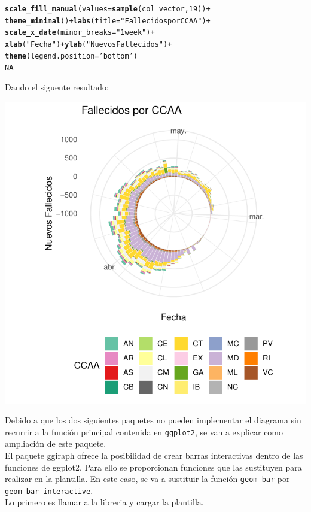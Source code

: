 \documentclass{article}\usepackage[]{graphicx}\usepackage[]{color}
\makeatletter
\def\maxwidth{ %
  \ifdim\Gin@nat@width>\linewidth
    \linewidth
  \else
    \Gin@nat@width
  \fi
}
\newcommand{\hlnum}[1]{\textcolor[rgb]{0.686,0.059,0.569}{#1}}%
\newcommand{\hlstr}[1]{\textcolor[rgb]{0.192,0.494,0.8}{#1}}%
\newcommand{\hlopt}[1]{\textcolor[rgb]{0,0,0}{#1}}%
\newcommand{\hlstd}[1]{\textcolor[rgb]{0.345,0.345,0.345}{#1}}%
\newcommand{\hlkwc}[1]{\textcolor[rgb]{0.333,0.667,0.333}{#1}}%
\newcommand{\hlkwd}[1]{\textcolor[rgb]{0.737,0.353,0.396}{\textbf{#1}}}%
\newenvironment{kframe}{%
 \def\at@end@of@kframe{}%
 \ifinner\ifhmode%
  \def\at@end@of@kframe{\end{minipage}}%
  \begin{minipage}{\columnwidth}%
 \fi\fi%
 \def\FrameCommand##1{\hskip\@totalleftmargin \hskip-\fboxsep
 \colorbox{shadecolor}{##1}\hskip-\fboxsep
     \hskip-\linewidth \hskip-\@totalleftmargin \hskip\columnwidth}%
 \MakeFramed {\advance\hsize-\width
   \@totalleftmargin\z@ \linewidth\hsize
   \@setminipage}}%
 {\par\unskip\endMakeFramed%
 \at@end@of@kframe}
\newenvironment{knitrout}{}{} %
\makeatother
\begin{document}
\begin{knitrout}
\color{fgcolor}\begin{kframe}
\begin{alltt}
  \hlkwd{scale_fill_manual}\hlstd{(}\hlkwc{values} \hlstd{=} \hlkwd{sample}\hlstd{(col_vector,} \hlnum{19}\hlstd{))} \hlopt{+}
  \hlkwd{theme_minimal}\hlstd{()} \hlopt{+} \hlkwd{labs}\hlstd{(}\hlkwc{title} \hlstd{=} \hlstr{"Fallecidos por CCAA"}\hlstd{)} \hlopt{+}
  \hlkwd{scale_x_date}\hlstd{(}\hlkwc{minor_breaks} \hlstd{=} \hlstr{"1 week"}\hlstd{)} \hlopt{+}
  \hlkwd{xlab}\hlstd{(}\hlstr{"Fecha"}\hlstd{)}\hlopt{+}\hlkwd{ylab}\hlstd{(}\hlstr{"Nuevos Fallecidos"}\hlstd{)}\hlopt{+}
  \hlkwd{theme}\hlstd{(}\hlkwc{legend.position} \hlstd{=} \hlstr{'bottom'}\hlstd{)}
\hlnum{NA}
\end{alltt}
\end{kframe}
\end{knitrout}
Dando el siguente resultado:
\begin{knitrout}
\color{fgcolor}

{\centering \includegraphics[width=\maxwidth]{figure/plot_col_sep_gg-1} 

}



\end{knitrout}
\clearpage
Debido a que los dos siguientes paquetes no pueden implementar el diagrama sin recurrir a la funci\'on principal contenida en \texttt{ggplot2}, se van a explicar como ampliaci\'on de este paquete.~\\
El paquete ggiraph %
ofrece la posibilidad de crear barras interactivas dentro de las funciones de ggplot2. Para ello se proporcionan funciones que las sustituyen para realizar en la plantilla. En este caso, se va a sustituir la funci\'on \texttt{geom-bar} por \texttt{geom-bar-interactive}.~\\
Lo primero es llamar a la libreria y cargar la plantilla.
\end{document}
